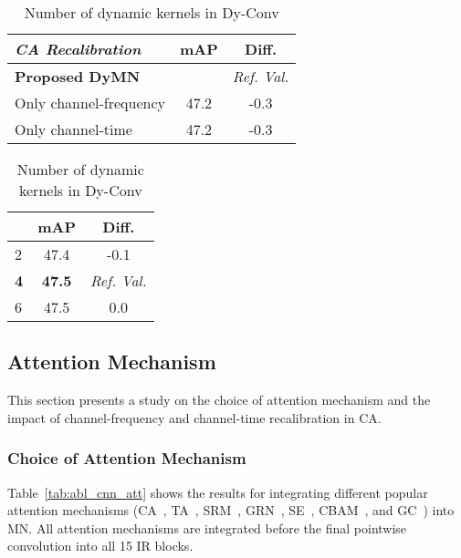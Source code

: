 \documentclass[lettersize,journal]{IEEEtran}
\begin{document}
\begin{table}[t!]

\centering
\begin{minipage}[t]{\columnwidth}
\caption{Effect of applying CA selectively for channel-time and channel-frequency recalibration.}
\label{tab:abl_ca}

\centering
\begin{tabular}{@{}lcc@{}}
\toprule
\textit{CA Recalibration} & \textbf{mAP} & \textbf{Diff.}  \\ \midrule
\textbf{Proposed DyMN} &  & \textit{Ref. Val.} \\
\midrule
Only channel-frequency & 47.2  & -0.3  \\ 
Only channel-time & 47.2 &  -0.3  \\ 
 \bottomrule
\end{tabular}
\end{minipage}

\bigskip

\centering
\begin{minipage}[t]{\columnwidth}
\caption{Number of dynamic kernels  in Dy-Conv}
\label{tab:abl_dyn_kernels_k}

\centering
\begin{tabular}{@{}lcc@{}}
\toprule
 & \textbf{mAP} & \textbf{Diff.} \\ \midrule
2 & 47.4 & -0.1\\
\textbf{4} & \textbf{47.5} & \textit{Ref. Val.} \\
6 & 47.5 & 0.0\\ 
 \bottomrule
\end{tabular}
\end{minipage}

\end{table}



\subsection{Attention Mechanism}
\label{subsec:abl_att}

This section presents a study on the choice of attention mechanism and the impact of channel-frequency and channel-time recalibration in CA. 

\subsubsection{Choice of Attention Mechanism} 

Table~\ref{tab:abl_cnn_att} shows the results for integrating different popular attention mechanisms (CA~\cite{hou2021coordinate}, TA~\cite{misra2021triplet}, SRM~\cite{lee2019srm}, GRN~\cite{woo2023convnextv2}, SE~\cite{Hu18Squeeze}, CBAM~\cite{woo2018cbam}, and GC~\cite{cao2019gcnet}) into MN. All attention mechanisms are integrated before the final pointwise convolution into all 15 IR blocks.
\end{document}
